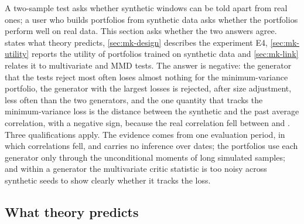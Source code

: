 A two-sample test asks whether synthetic windows can be told apart from real ones; a user who
builds portfolios from synthetic data asks whether the portfolios perform well on real data. This
section asks whether the two answers agree.  states what theory predicts,
\cref{sec:mk-design} describes the experiment E4, \cref{sec:mk-utility} reports the utility of
portfolios trained on synthetic data and \cref{sec:mk-link} relates it to multivariate \WC{} and
MMD tests. The answer is negative: the generator that the tests reject most often loses almost
nothing for the minimum-variance portfolio, the generator with the largest losses is rejected,
after size adjustment, less often than the two \iid{} generators, and the one quantity that
tracks the minimum-variance loss is the distance between the synthetic and the past average
correlation, with a negative sign, because the real correlation fell between \TRAIN{} and
\TEST{}. Three qualifications apply. The evidence comes from one evaluation period, in which
correlations fell, and carries no inference over dates; the portfolios use each generator only
through the unconditional moments of long simulated samples; and within a generator the
multivariate critic statistic is too noisy across synthetic seeds to show clearly whether it
tracks the loss.

\subsection{What theory predicts}\label{sec:mk-theory}


